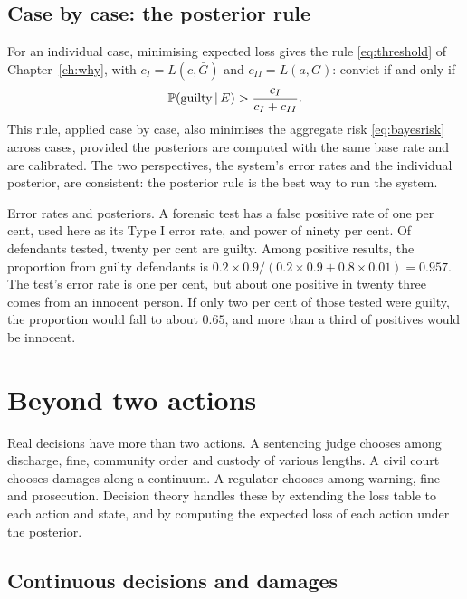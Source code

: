 \subsection{Case by case: the posterior rule}

For an individual case, minimising expected loss gives the rule \eqref{eq:threshold} of Chapter~\ref{ch:why}, with $c_I = L(c,\bar G)$ and $c_{II} = L(a,G)$: convict if and only if
\begin{equation}
\mathbb{P}(\text{guilty}\,\vert\, E) > \frac{c_I}{c_I + c_{II}} .
\end{equation}
This rule, applied case by case, also minimises the aggregate risk \eqref{eq:bayesrisk} across cases, provided the posteriors are computed with the same base rate and are calibrated. The two perspectives, the system's error rates and the individual posterior, are consistent: the posterior rule is the best way to run the system.

\begin{keybox}
Error rates and posteriors. A forensic test has a false positive rate of one per cent, used here as its Type I error rate, and power of ninety per cent. Of defendants tested, twenty per cent are guilty. Among positive results, the proportion from guilty defendants is $0.2\times 0.9/(0.2\times 0.9 + 0.8\times 0.01) = 0.957$. The test's error rate is one per cent, but about one positive in twenty three comes from an innocent person. If only two per cent of those tested were guilty, the proportion would fall to about $0.65$, and more than a third of positives would be innocent.
\end{keybox}

\section{Beyond two actions}

Real decisions have more than two actions. A sentencing judge chooses among discharge, fine, community order and custody of various lengths. A civil court chooses damages along a continuum. A regulator chooses among warning, fine and prosecution. Decision theory handles these by extending the loss table to each action and state, and by computing the expected loss of each action under the posterior.

\subsection{Continuous decisions and damages}

